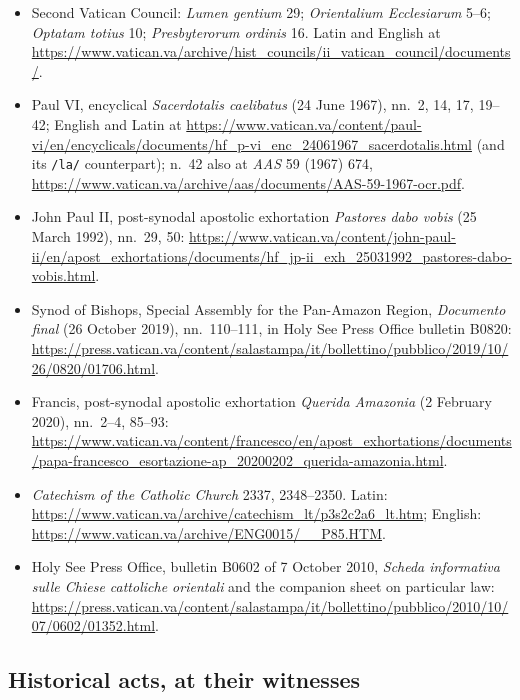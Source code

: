 \begin{itemize}
\item Second Vatican Council: \emph{Lumen gentium} 29; \emph{Orientalium Ecclesiarum} 5--6; \emph{Optatam totius} 10; \emph{Presbyterorum ordinis} 16. Latin and English at \url{https://www.vatican.va/archive/hist_councils/ii_vatican_council/documents/}.
\item Paul VI, encyclical \emph{Sacerdotalis caelibatus} (24 June 1967), nn.~2, 14, 17, 19--42; English and Latin at \url{https://www.vatican.va/content/paul-vi/en/encyclicals/documents/hf_p-vi_enc_24061967_sacerdotalis.html} (and its \texttt{/la/} counterpart); n.~42 also at \emph{AAS} 59 (1967) 674, \url{https://www.vatican.va/archive/aas/documents/AAS-59-1967-ocr.pdf}.
\item John Paul II, post-synodal apostolic exhortation \emph{Pastores dabo vobis} (25 March 1992), nn.~29, 50: \url{https://www.vatican.va/content/john-paul-ii/en/apost_exhortations/documents/hf_jp-ii_exh_25031992_pastores-dabo-vobis.html}.
\item Synod of Bishops, Special Assembly for the Pan-Amazon Region, \emph{Documento final} (26 October 2019), nn.~110--111, in Holy See Press Office bulletin B0820: \url{https://press.vatican.va/content/salastampa/it/bollettino/pubblico/2019/10/26/0820/01706.html}.
\item Francis, post-synodal apostolic exhortation \emph{Querida Amazonia} (2 February 2020), nn.~2--4, 85--93: \url{https://www.vatican.va/content/francesco/en/apost_exhortations/documents/papa-francesco_esortazione-ap_20200202_querida-amazonia.html}.
\item \emph{Catechism of the Catholic Church} 2337, 2348--2350. Latin: \url{https://www.vatican.va/archive/catechism_lt/p3s2c2a6_lt.htm}; English: \url{https://www.vatican.va/archive/ENG0015/__P85.HTM}.
\item Holy See Press Office, bulletin B0602 of 7 October 2010, \emph{Scheda informativa sulle Chiese cattoliche orientali} and the companion sheet on particular law: \url{https://press.vatican.va/content/salastampa/it/bollettino/pubblico/2010/10/07/0602/01352.html}.
\end{itemize}

\subsection*{Historical acts, at their witnesses}


